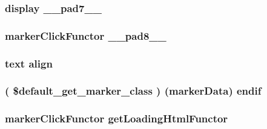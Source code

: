 \label{dc/d04/listings__map_8php_af4b5cf450fa285756c93d9a01be423a7}
\hypertarget{listings__map_8php_a4498aa981c74a39e528325dd26431679}{
\subsubsection[{\_\-\_\-pad7\_\-\_\-}]{\setlength{\rightskip}{0pt plus 5cm}display {\bf \_\-\_\-pad7\_\-\_\-}}}
\label{dc/d04/listings__map_8php_a4498aa981c74a39e528325dd26431679}
\hypertarget{listings__map_8php_aa3366304065e1c423a969e3b6450e228}{
\subsubsection[{\_\-\_\-pad8\_\-\_\-}]{\setlength{\rightskip}{0pt plus 5cm}markerClickFunctor {\bf \_\-\_\-pad8\_\-\_\-}}}
\label{dc/d04/listings__map_8php_aa3366304065e1c423a969e3b6450e228}
\hypertarget{listings__map_8php_a87061853e71984e1c11ad6f01f1035b2}{
\subsubsection[{align}]{\setlength{\rightskip}{0pt plus 5cm}text {\bf align}}}
\label{dc/d04/listings__map_8php_a87061853e71984e1c11ad6f01f1035b2}
\hypertarget{listings__map_8php_a9766b5964b96b85e50bbdf50a4d7bb71}{
\subsubsection[{endif}]{ ( \$default\_\-get\_\-marker\_\-class ) (markerData) {\bf endif}}}
\label{dc/d04/listings__map_8php_a9766b5964b96b85e50bbdf50a4d7bb71}
\hypertarget{listings__map_8php_a54485ce94b255dcb3cd7d3732ada64d1}{
\subsubsection[{getLoadingHtmlFunctor}]{\setlength{\rightskip}{0pt plus 5cm}markerClickFunctor {\bf getLoadingHtmlFunctor}}}
